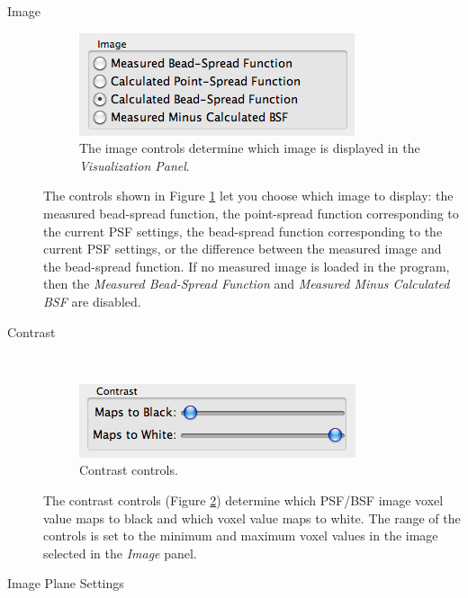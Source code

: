 \documentclass[11pt,titlepage,twoside]{article}
\begin{document}
\begin{description}

  \item[Image] \hfill
   \begin{figure}[h]
    \centering
    \includegraphics[scale=0.5]{images/ImageControls}
    \caption{The image controls determine which image is displayed in the \emph{Visualization Panel}.}
    \label{fig:ImageControls}
  \end{figure}
 
The controls shown in Figure \ref{fig:ImageControls} let you choose which image to display: the measured bead-spread function, the point-spread function corresponding to the current PSF settings, the bead-spread function corresponding to the current PSF settings, or the difference between the measured image and the bead-spread function. If no measured image is loaded in the program, then the \emph{Measured Bead-Spread Function} and \emph{Measured Minus Calculated BSF} are disabled.

  \item[Contrast] \hfill \\
  
    \begin{figure}[h]
    \centering
    \includegraphics[scale=0.5]{images/ContrastControls}
    \caption{Contrast controls.}
    \label{fig:ContrastControls}
  \end{figure}
  
  The contrast controls (Figure \ref{fig:ContrastControls}) determine which PSF/BSF image voxel value maps to black and which voxel value maps to white. The range of the controls is set to the minimum and maximum voxel values in the image selected in the \emph{Image} panel.

  \item[Image Plane Settings] \hfill \\
  

\end{description}
\end{document}

